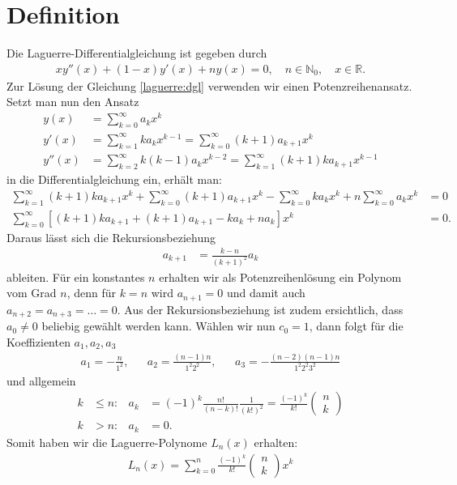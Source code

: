 %
%
%
\section{Definition
\label{laguerre:section:definition}}
Die Laguerre-Differentialgleichung ist gegeben durch
\begin{align}
x y''(x) + (1 - x) y'(x) + n y(x)
=
0
, \quad
n \in \mathbb{N}_0
, \quad
x \in \mathbb{R}
.
\label{laguerre:dgl}
\end{align}
Zur Lösung der Gleichung \eqref{laguerre:dgl}
verwenden wir einen Potenzreihenansatz.
Setzt man nun den Ansatz
\begin{align*}
y(x) 
&= 
\sum_{k=0}^\infty a_k x^k
\\
y'(x)
& = 
\sum_{k=1}^\infty k a_k x^{k-1}
=
\sum_{k=0}^\infty (k+1) a_{k+1} x^k
\\
y''(x)
&=
\sum_{k=2}^\infty k (k-1) a_k x^{k-2}
=
\sum_{k=1}^\infty (k+1) k a_{k+1} x^{k-1}
\end{align*}
in die Differentialgleichung ein, erhält man:
\begin{align*}
\sum_{k=1}^\infty (k+1) k a_{k+1} x^k
+ \sum_{k=0}^\infty (k+1) a_{k+1} x^k
- \sum_{k=0}^\infty k a_k x^k
+ n \sum_{k=0}^\infty a_k x^k 
&= 
0\\
\sum_{k=0}^\infty
\left[ (k+1) k a_{k+1} + (k+1) a_{k+1} - k a_k + n a_k \right] x^k
&=
0.
\end{align*}
Daraus lässt sich die Rekursionsbeziehung
\begin{align*}
a_{k+1}
&= 
\frac{k-n}{(k+1) ^ 2} a_k
\end{align*}
ableiten.
Für ein konstantes $n$ erhalten wir als Potenzreihenlösung ein Polynom vom Grad $n$,
denn für $k=n$ wird $a_{n+1} = 0$ und damit auch $a_{n+2}=a_{n+3}=\ldots=0$.
Aus der Rekursionsbeziehung ist zudem ersichtlich, 
dass $a_0 \neq 0$ beliebig gewählt werden kann.
Wählen wir nun $c_0 = 1$, dann folgt für die Koeffizienten $a_1, a_2, a_3$
\begin{align*}
a_1 
= 
-\frac{n}{1^2}
,&&
a_2 
= 
\frac{(n-1)n}{1^2 2^2}
,&&
a_3
=
-\frac{(n-2)(n-1)n}{1^2 2^2 3^2}
\end{align*}
und allgemein
\begin{align*}
k&\leq n:
&
a_k 
&=
(-1)^k \frac{n!}{(n-k)!} \frac{1}{(k!)^2} 
= 
\frac{(-1)^k}{k!}
\begin{pmatrix}
n
\\
k
\end{pmatrix}
\\
k&>n:
&
a_k
&=
0.
\end{align*}
Somit haben wir die Laguerre-Polynome $L_n(x)$ erhalten:
\begin{align}
L_n(x)
=
\sum_{k=0}^{n} 
\frac{(-1)^k}{k!}
\begin{pmatrix}
n \\
k
\end{pmatrix}
x^k
\label{laguerre:polynom}
\end{align}

